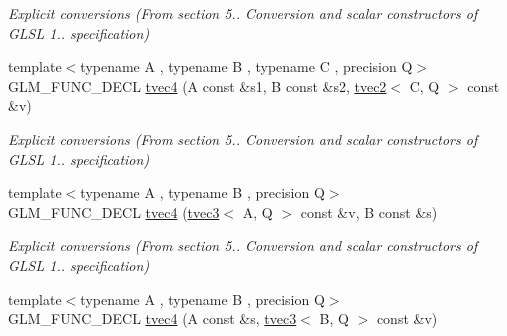 \begin{DoxyCompactItemize}
\begin{DoxyCompactList}\small\item\em Explicit conversions (From section 5.. Conversion and scalar constructors of G\+L\+SL 1.. specification) \end{DoxyCompactList}\item 
{\footnotesize template$<$typename A , typename B , typename C , precision Q$>$ }\\G\+L\+M\+\_\+\+F\+U\+N\+C\+\_\+\+D\+E\+CL \hyperlink{structglm_1_1detail_1_1tvec4_a8ef9e52bfba428b34a6503b41d405414}{tvec4} (A const \&s1, B const \&s2, \hyperlink{structglm_1_1detail_1_1tvec2}{tvec2}$<$ C, Q $>$ const \&v)\hypertarget{structglm_1_1detail_1_1tvec4_a8ef9e52bfba428b34a6503b41d405414}{}\label{structglm_1_1detail_1_1tvec4_a8ef9e52bfba428b34a6503b41d405414}

\begin{DoxyCompactList}\small\item\em Explicit conversions (From section 5.. Conversion and scalar constructors of G\+L\+SL 1.. specification) \end{DoxyCompactList}\item 
{\footnotesize template$<$typename A , typename B , precision Q$>$ }\\G\+L\+M\+\_\+\+F\+U\+N\+C\+\_\+\+D\+E\+CL \hyperlink{structglm_1_1detail_1_1tvec4_a3cfd3a19a14623991a562e5834cc6d1f}{tvec4} (\hyperlink{structglm_1_1detail_1_1tvec3}{tvec3}$<$ A, Q $>$ const \&v, B const \&s)\hypertarget{structglm_1_1detail_1_1tvec4_a3cfd3a19a14623991a562e5834cc6d1f}{}\label{structglm_1_1detail_1_1tvec4_a3cfd3a19a14623991a562e5834cc6d1f}

\begin{DoxyCompactList}\small\item\em Explicit conversions (From section 5.. Conversion and scalar constructors of G\+L\+SL 1.. specification) \end{DoxyCompactList}\item 
{\footnotesize template$<$typename A , typename B , precision Q$>$ }\\G\+L\+M\+\_\+\+F\+U\+N\+C\+\_\+\+D\+E\+CL \hyperlink{structglm_1_1detail_1_1tvec4_a00972125f3cbeec17aaf42cacae4e73e}{tvec4} (A const \&s, \hyperlink{structglm_1_1detail_1_1tvec3}{tvec3}$<$ B, Q $>$ const \&v)\hypertarget{structglm_1_1detail_1_1tvec4_a00972125f3cbeec17aaf42cacae4e73e}{}\label{structglm_1_1detail_1_1tvec4_a00972125f3cbeec17aaf42cacae4e73e}


\end{DoxyCompactItemize}
